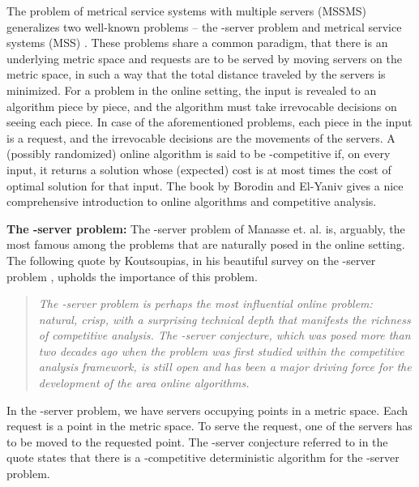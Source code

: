 \documentclass[11pt]{article}
\theoremstyle{plain}\newtheorem{theorem}{Theorem}
\theoremstyle{definition}
\theoremstyle{remark}
\begin{document}
The problem of metrical service systems with multiple servers (MSSMS) generalizes two well-known problems -- the -server problem \cite{ManasseMS88} and metrical service systems (MSS) \cite{ChrobakL92,ManasseMS88}. These problems share a common paradigm, that there is an underlying metric space 
and requests are to be served by moving servers on the metric space, in such a way that the total distance traveled by the servers is minimized.
For a problem in the online setting, the input is revealed to an algorithm piece by piece, and the algorithm must take irrevocable decisions on seeing each piece. In case of the aforementioned problems, each piece in the input is a request, and the irrevocable decisions are the movements of the servers. A (possibly randomized) online algorithm is said to be -competitive if, on every input, it returns a solution whose (expected) cost is at most  times the cost of optimal solution for that input. The book by Borodin and El-Yaniv \cite{BorodinE} gives a nice comprehensive introduction to online algorithms and competitive analysis.


\noindent
\textbf{The -server problem:} The -server problem of Manasse et. al. \cite{ManasseMS88} is, arguably, the most famous among the problems that are naturally posed in the online setting. The following quote by Koutsoupias, in his beautiful survey on the -server problem \cite{Koutsoupias09}, upholds the importance of this problem.
\begin{quote}
\textit{The -server problem is perhaps the most influential online problem: natural, crisp, with a surprising technical depth that manifests the richness of competitive analysis. The -server conjecture, which was posed more than two decades ago when the problem was first studied within the competitive analysis framework, is still open and has been a major driving force for the development of the area online algorithms.}
\end{quote}
In the -server problem, we have  servers occupying points in a metric space. Each request is a point in the metric space. To serve the request, one of the servers has to be moved to the requested point. The -server conjecture referred to in the quote states that there is a -competitive deterministic algorithm for the -server problem.
\end{document}

